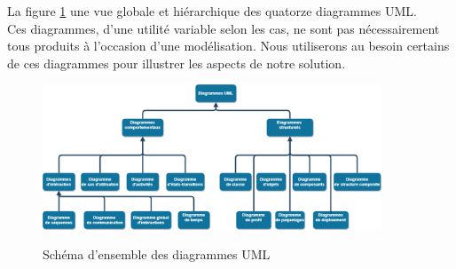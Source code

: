 La figure \ref{fig:7.1} une vue globale et hiérarchique des quatorze diagrammes UML.\\
Ces diagrammes, d'une utilité variable selon les cas, ne sont pas nécessairement tous produits à l'occasion d'une modélisation. Nous utiliserons au besoin certains de ces diagrammes pour illustrer les aspects de notre solution.
\begin{figure}
	\centering
	\begin{minipage}{18cm}
		\centering
		{\includegraphics[height=0.4\textheight,width=0.9\textwidth]{fig/Uml-Diagrams-overview.png}}
	\end{minipage}
	\caption{Schéma d'ensemble des diagrammes UML}
	\label{fig:7.1}
\end{figure}

\clearpage 


